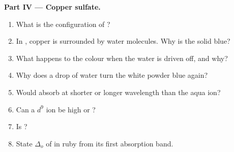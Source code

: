 \begin{problem}
\medskip
\noindent\textbf{Part IV --- Copper sulfate.}
\begin{enumerate}[resume]
  \item What is the configuration of ?
  \item In , copper is surrounded by water molecules. Why is the solid blue?
  \item What happens to the colour when the water is driven off, and why?
  \item Why does a drop of water turn the white powder blue again?
  \item Would  absorb at shorter or longer wavelength than the aqua ion?
  \item Can a $d^9$ ion be high or ?
  \item Is  ?
  \item State $\Delta_o$ of  in ruby from its first absorption band.
\end{enumerate}
\end{problem}
